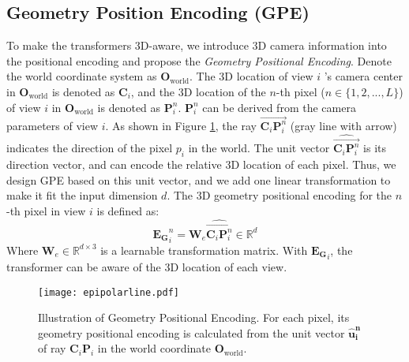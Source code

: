 \documentclass{bmvc2k}
\begin{document}
 




\vspace{-0.5em}
\subsection{Geometry Position Encoding (GPE)}
\vspace{-0.5em}
\label{sec:gpe}
To make the transformers 3D-aware, we introduce 3D camera information \cite{andrew2001multiple, zhao2021camera} into the positional encoding and propose the \textit{Geometry Positional Encoding}. 
Denote the world coordinate system as $\mathbf{O}_{\text{world}}$. The 3D location of view $i$ 's camera center in $\mathbf{O}_{\text{world}}$ is denoted as $\mathbf{C}_i$, and the 3D location of the $n$-th pixel ($n\in \{1,2,..., L\}$) of view $i$ in $\mathbf{O}_{\text{world}}$ is denoted as  $\mathbf{P}_i^n$.  $\mathbf{P}_i^n$ can be derived from the camera parameters of view $i$.  
As shown in Figure \ref{fig:epipolar}, the ray $ \overrightarrow{\mathbf{C}_i \mathbf{P}_i^n}$  (gray line with arrow) indicates the direction of the pixel $p_i$ in the world. 
The unit vector $ \widehat{\overrightarrow{\mathbf{C}_i \mathbf{P}_i^n} } $ is its direction vector, and can encode the relative 3D location of each pixel. 
Thus, we design GPE based on this unit vector, and we add one linear transformation to make it fit the input dimension $d$. The 3D geometry positional encoding for the $n$-th pixel in view $i$ is defined as:   
\begin{equation}
\label{eq:3d_PE}
    \mathbf{E_G}_{i}^{n} = \mathbf{W}_e  \widehat{\overrightarrow{\mathbf{C}_i \mathbf{P}_i^n} }  \in \mathbb{R}^d
\end{equation}
Where $\mathbf{W}_e \in \mathbb{R}^{d \times 3}$ is a learnable transformation matrix. With $\mathbf{E_G}_{i}$, the transformer can be aware of the 3D location of each view.  


\vspace{-0.5em}
\begin{figure}[!ht]
    \centering
    \texttt{[image: epipolarline.pdf]}
    \vspace{-1 em}
    \caption{ \footnotesize{Illustration of Geometry Positional Encoding. For each pixel, its geometry positional encoding is calculated from the unit vector $\mathbf{\hat{u}_i^n} $ of ray ${\mathbf{C}_i \mathbf{P}_i}$ in the world coordinate $\mathbf{O}_{\text{world}}$.}}  
    \label{fig:epipolar}
\end{figure}
\end{document}
